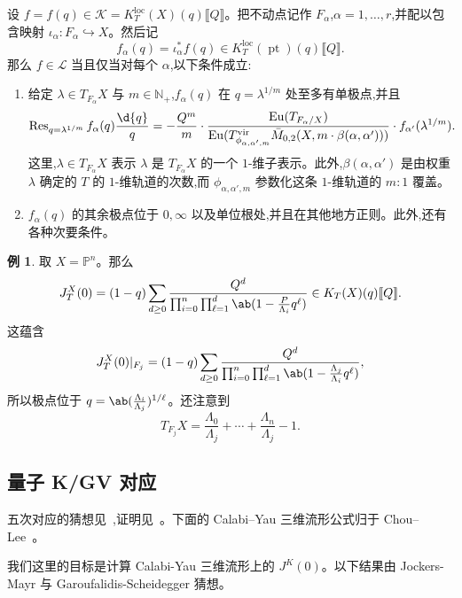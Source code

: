 \documentclass{amsart}
\theoremstyle{definition}
\newtheorem{exm}[thm]{例}
\theoremstyle{remark}
\theoremstyle{plain}
\theoremstyle{definition}
\theoremstyle{remark}
\newcommand{\N}{\mathbb{N}}
\renewcommand{\P}{\mathbb{P}}
\newcommand{\mc}[1]{\mathcal{#1}}
\newcommand{\mr}[1]{\mathrm{#1}}
\newcommand{\on}[1]{\operatorname{#1}}
\newcommand{\1}{\mathbf{1}}
\newcommand{\2}{\mathbf{2}}
\newcommand{\3}{\mathbf{3}}
\newcommand{\vir}{\mr{vir}}
\newcommand{\ps}[1]{\llbracket #1 \rrbracket}
\newcommand{\loc}{\mr{loc}}
\begin{document}
设 \(f = f(q) \in \mc{K} = K_T^{\loc}(X)(q)\ps{Q}\)。把不动点记作 \(F_{\alpha}\),\(\alpha = 1, \ldots, r\),并配以包含映射 \(\iota_{\alpha} \colon F_{\alpha} \hookrightarrow X\)。然后记
\[ f_{\alpha}(q) = \iota_{\alpha}^* f(q) \in K_T^{\loc}(\on{pt})(q)\ps{Q}. \]
那么 \(f \in \mc{L}\) 当且仅当对每个 \(\alpha\),以下条件成立:
\begin{enumerate}
    \item 给定 \(\lambda \in T_{F_{\alpha}} X\) 与 \(m \in \N_+\),\(f_{\alpha}(q)\) 在 \(q = \lambda^{1/m}\) 处至多有单极点,并且
        \[ \on{Res}_{q = \lambda^{1/m}} f_{\alpha}(q) \frac{\d{q}}{q} = -\frac{Q^m}{m} \cdot \frac{\on{Eu}(T_{F_{\alpha}/X})}{\on{Eu}(T^{\vir}_{\phi_{\alpha,\alpha',m}}\bar{M}_{0,2}(X, m \cdot \beta(\alpha, \alpha')))} \cdot f_{\alpha'}(\lambda^{1/m}). \]
        这里,\(\lambda \in T_{F_{\alpha}}X\) 表示 \(\lambda\) 是 \(T_{F_{\alpha}} X\) 的一个 \(1\)-维子表示。此外,\(\beta(\alpha,\alpha')\) 是由权重 \(\lambda\) 确定的 \(T\) 的 \(1\)-维轨道的次数,而 \(\phi_{\alpha, \alpha', m}\) 参数化这条 \(1\)-维轨道的 \(m:1\) 覆盖。
    \item \(f_{\alpha}(q)\) 的其余极点位于 \(0, \infty\) 以及单位根处,并且在其他地方正则。此外,还有各种次要条件。
\end{enumerate}

\begin{exm}
    取 \(X = \P^n\)。那么
    \[ J_T^X(0) = (1-q) \sum_{d \geq 0} \frac{Q^d}{\prod_{i=0}^n \prod_{\ell = 1}^d \ab(1 - \frac{P}{\Lambda_i} q^{\ell})} \in K_T(X)(q) \ps{Q}. \]
    这蕴含
    \[ J_T^X(0) |_{F_j} = (1-q) \sum_{d \geq 0} \frac{Q^d}{\prod_{i=0}^n \prod_{\ell = 1}^d \ab(1 - \frac{\Lambda_j}{\Lambda_i}q^{\ell})}, \]
    所以极点位于 \(q = \ab(\frac{\Lambda_i}{\Lambda_j})^{1/\ell}\)。还注意到
    \[ T_{F_j} X = \frac{\Lambda_0}{\Lambda_j} + \cdots + \frac{\Lambda_n}{\Lambda_j} - 1. \]
\end{exm}

\subsection{量子 K/GV 对应}%
\label{sub:Quantum K/GV correspondence}

五次对应的猜想见~\cite{GaroufalidisScheidegger2022},证明见~\cite{ChouLeeQuintic}。下面的 Calabi--Yau 三维流形公式归于 Chou--Lee~\cite{ChouLee2025}。

我们这里的目标是计算 Calabi-Yau 三维流形上的 \(J^K(0)\)。以下结果由 Jockers-Mayr 与 Garoufalidis-Scheidegger 猜想。
\end{document}
